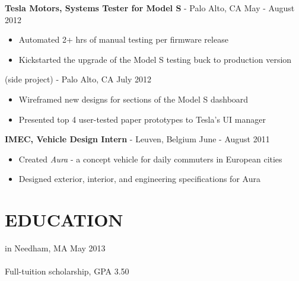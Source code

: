 \documentclass[margin]{res}
\begin{document}
 \hspace*{7mm}	{\bf Tesla Motors, Systems Tester for Model S} - Palo Alto, CA \hfill            May - August 2012\
\smallskip
	\begin{itemize}  \itemsep -4pt %
	
	 \item Automated 2+ hrs of manual testing per firmware release
	\item Kickstarted the upgrade of the Model S testing buck to production version
	\end{itemize}


 \hspace*{7mm}{\bf Tesla Motors, User Experience} (side project) - Palo Alto, CA \hfill            July 2012\
\smallskip
	\begin{itemize}  \itemsep -4pt %
	
	 \item Wireframed new designs for sections of the Model S dashboard
	\item  Presented top 4 user-tested paper prototypes to Tesla's UI manager
	\end{itemize}
 

 \hspace*{7mm}	{ \bf IMEC, Vehicle Design Intern} - Leuven, Belgium \hfill            June - August 2011\
\smallskip
	\begin{itemize}  \itemsep -4pt %
	
	 \item Created {\emph{Aura}} - a concept vehicle for daily commuters in European cities
\item Designed exterior, interior, and engineering specifications for Aura
	\end{itemize}



\vspace*{9mm}


\section{EDUCATION}   \hspace*{7mm}{\large\bf Franklin W. Olin College of Engineering} in Needham, MA \hfill May 2013\\
  \hspace*{7mm}{B.S. in Electrical \& Computer Engineering (ECE); focus on UX design} \\  
  \hspace*{7mm}Full-tuition scholarship,  GPA 3.50
\end{document}
